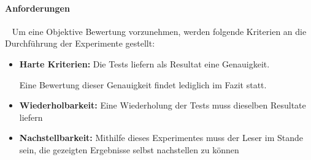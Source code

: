 \paragraph{Anforderungen} ~\newline
Um eine Objektive Bewertung vorzunehmen, werden folgende Kriterien an die Durchführung der Experimente gestellt: 

\begin{itemize}
	\item \textbf{Harte Kriterien:} Die Tests liefern als Resultat eine Genauigkeit. 
	
	Eine Bewertung dieser Genauigkeit findet lediglich im Fazit statt. 
	\item \textbf{Wiederholbarkeit:} Eine Wiederholung der Tests muss dieselben Resultate liefern
	\item \textbf{Nachstellbarkeit:} Mithilfe dieses Experimentes muss der Leser im Stande sein, die gezeigten Ergebnisse selbst nachstellen zu können
\end{itemize}
